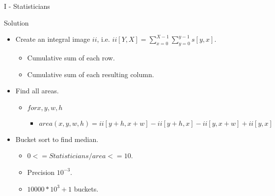 \renewcommand{\insertshortauthor}{Problem Author: Fredrik Svensson}
\begin{frame}{I - Statisticians}

\begin{block}{Solution}
  \begin{itemize}
    \item Create an integral image $ii$, i.e. $ii[Y,X] = \sum_{x=0}^{X-1} \sum_{y=0}^{y-1} s[y,x]$.
    \begin{itemize}
      \item Cumulative sum of each row.
      \item Cumulative sum of each resulting column.
    \end{itemize}
    \item Find all areas.
    \begin{itemize}
      \item $for x,y,w,h$
      \begin{itemize}
        \item $area(x,y,w,h) = ii[y+h,x+w]-ii[y+h,x]-ii[y,x+w]+ii[y,x]$
      \end{itemize}
    \end{itemize}
    \item Bucket sort to find median.
    \begin{itemize}
      \item $0 <= Statisticians/area <= 10$.
      \item Precision $10^{-3}$.
      \item $10000*10^3+1$ buckets.
    \end{itemize}
  \end{itemize}
\end{block}

\end{frame}
